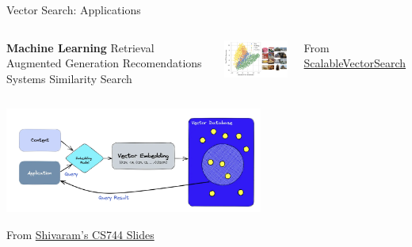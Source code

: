 \placelogofalse
\begin{frame}{Vector Search: Applications}
\begin{columns}
  \begin{outline}
  \1 \textbf{Machine Learning}
  \1 Retrieval Augmented Generation
  \1 Recomendations Systems
  \1 Similarity Search
\end{outline}
\includegraphics[width=5.0cm]{assets/image_vec.png}

{\tiny From \href{https://github.com/intel/ScalableVectorSearch}{ScalableVectorSearch}}

\end{columns}
\begin{center}
\centering

\includegraphics[width=8.5cm]{assets/vec_workflow.png}

{\tiny From \href{https://pages.cs.wisc.edu/~shivaram/cs744-sp25-slides/cs744-lyticdb-v.pdf}{Shivaram's CS744 Slides}}

\end{center}
\end{frame}
\placelogotrue


